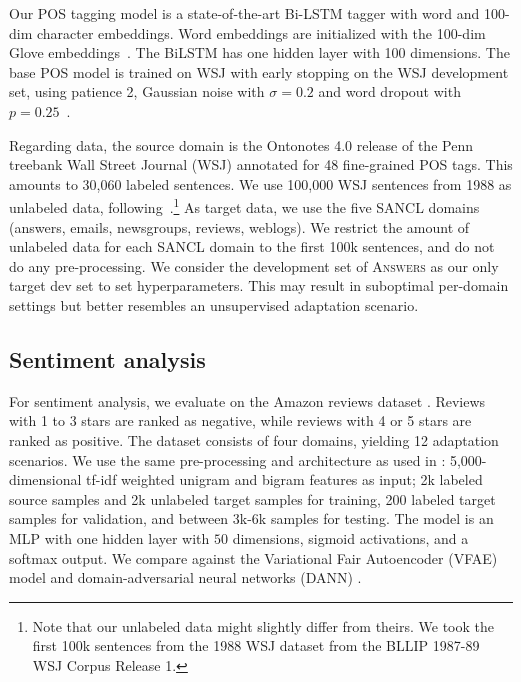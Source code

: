 \documentclass[11pt,a4paper]{article}
\begin{document}
Our POS tagging model is a state-of-the-art Bi-LSTM tagger \cite{Plank2016} with word and 100-dim character embeddings. Word embeddings are initialized with the 100-dim Glove embeddings~\cite{pennington2014glove}. The BiLSTM has one hidden layer with 100 dimensions. The base POS model is trained on WSJ with early stopping on the WSJ development set, using patience 2, Gaussian noise with $\sigma=0.2$ and word dropout with $p=0.25$~\cite{TACL885}. 


Regarding data, the source domain is the Ontonotes 4.0 release of the Penn treebank Wall Street Journal (WSJ) annotated for 48 fine-grained POS tags. This amounts to 30,060 labeled sentences. We use 100,000 WSJ sentences from 1988 as unlabeled data, following~.\footnote{Note that our unlabeled data might slightly differ from theirs. We took the first 100k sentences from the 1988 WSJ dataset from the BLLIP 1987-89 WSJ Corpus Release 1.}  As target data, we use the five SANCL domains (answers, emails, newsgroups, reviews, weblogs). We restrict the amount of unlabeled data for each SANCL domain to the first 100k sentences, and 
do not do any pre-processing. We consider the development set of \textsc{Answers} as our only target dev set to set hyperparameters. This may result in suboptimal per-domain settings but better resembles an unsupervised adaptation scenario. 

\subsection{Sentiment analysis} For sentiment analysis, we evaluate on the Amazon reviews dataset \cite{Blitzer2006}. Reviews with 1 to 3 stars are ranked as negative, while reviews with 4 or 5 stars are ranked as positive. The dataset consists of four domains, yielding 12 adaptation scenarios. We use the same pre-processing and architecture as used in \cite{Ganin2016,Saito2017}: 5,000-dimensional tf-idf weighted unigram and bigram features as input; 2k labeled source samples and 2k unlabeled target samples for training, 200 labeled target samples for validation, and between 3k-6k samples for testing. The model is an MLP with one hidden layer with $50$ dimensions, sigmoid activations, and a softmax output. We compare against the
Variational Fair Autoencoder (VFAE) \cite{louizos2015variational} model and domain-adversarial neural networks (DANN) \cite{Ganin2016}.
\end{document}
